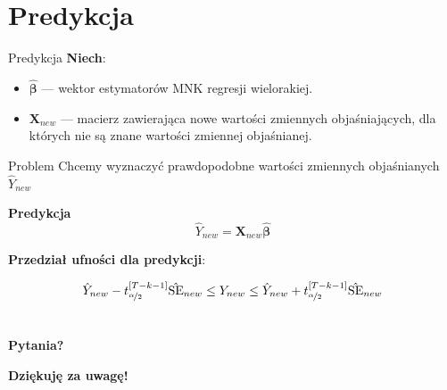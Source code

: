 \documentclass[a4paper, 11pt]{beamer}
\begin{document}
	\section{Predykcja}

	\begin{frame}{Predykcja}
		\textbf{Niech}:
		\begin{itemize}
			\item $\hat{\boldsymbol{\beta}}$ --- wektor estymatorów MNK regresji wielorakiej.
			\item $\boldsymbol{X}_{new}$ --- macierz zawierająca nowe wartości zmiennych objaśniających,
				dla których nie są znane wartości zmiennej objaśnianej.
		\end{itemize}
		
		\begin{alert}{Problem}
			Chcemy wyznaczyć prawdopodobne wartości zmiennych objaśnianych $\hat{Y}_{new}$
		\end{alert}
		
		
		\begin{block}{\textbf{Predykcja}}
			\[
				\hat{Y}_{new} = \boldsymbol{X}_{new} \hat{\boldsymbol{\beta}}
			\]
		\end{block}
		
		\textbf{Przedział ufności dla predykcji}:
		
		\[
			\hat{Y}_{new} - t^{\left[T - k - 1\right]}_{\nicefrac{\alpha}{2}} \hat{\mbox{SE}}_{new} \leq Y_{new} \leq \hat{Y}_{new} + t^{\left[T - k - 1\right]}_{\nicefrac{\alpha}{2}} \hat{\mbox{SE}}_{new}
		\]
	\end{frame}

	\section*{}

	\begin{frame}
		\center
		\Huge \bfseries
		Pytania?
	\end{frame}

	\begin{frame}
		\center
		\Huge \bfseries
		Dziękuję za uwagę!
	\end{frame}
\end{document}
